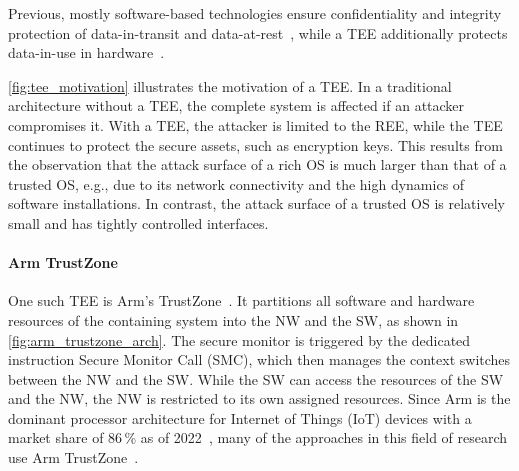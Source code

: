 
Previous, mostly software-based technologies ensure confidentiality and integrity protection of data-in-transit and data-at-rest~\cite{Pecholt2022}, while a \ac{TEE} additionally protects data-in-use in hardware~\cite{Pecholt2022, Lee:EECS-2022-96}.


\autoref{fig:tee_motivation} illustrates the motivation of a \ac{TEE}\@.
In a traditional architecture without a \ac{TEE}, the complete system is affected if an attacker compromises it.
With a \ac{TEE}, the attacker is limited to the \ac{REE}, while the \ac{TEE} continues to protect the secure assets, such as encryption keys.
This results from the observation that the attack surface of a rich OS is much larger than that of a trusted OS, e.g., due to its network connectivity and the high dynamics of software installations.
In contrast, the attack surface of a trusted OS is relatively small and has tightly controlled interfaces.




\paragraph{Arm TrustZone}
One such \ac{TEE} is Arm's TrustZone~\cite{ARM09, Ngabonziza2016}. It partitions all software and hardware resources of the containing system into the \ac{NW} and the \ac{SW}, as shown in \autoref{fig:arm_trustzone_arch}. The secure monitor is triggered by the dedicated instruction Secure Monitor Call (SMC), which then manages the context switches between the \ac{NW} and the \ac{SW}.
While the \ac{SW} can access the resources of the \ac{SW} and the \ac{NW}, the \ac{NW} is restricted to its own assigned resources.
Since Arm is the dominant processor architecture for Internet of Things (IoT) devices with a market share of 86\,\% as of 2022~\cite{eclipse}, many of the approaches in this field of research use Arm TrustZone~\cite{Valadares2021}.

